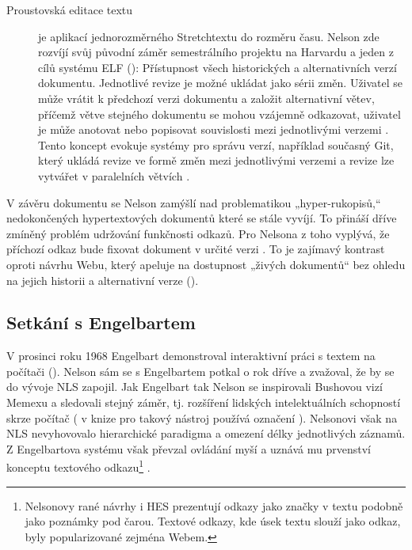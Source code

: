 \begin{description}
  \label{p:ht:proust}
  \item[Proustovská editace textu] je aplikací jednorozměrného Stretchtextu do rozměru času. Nelson zde rozvíjí svůj původní záměr semestrálního projektu na Harvardu a jeden z cílů systému ELF (): Přístupnost všech historických a alternativních verzí dokumentu. Jednotlivé revize je možné ukládat jako sérii změn. Uživatel se může vrátit k předchozí verzi dokumentu a založit alternativní větev, příčemž větve stejného dokumentu se mohou vzájemně odkazovat, uživatel je může anotovat nebo popisovat souvislosti mezi jednotlivými verzemi \autocite[20--21]{hin68}.
  Tento koncept evokuje systémy pro správu verzí, například současný Git, který ukládá revize ve formě změn mezi jednotlivými verzemi a revize lze vytvářet v paralelních větvích \autocite{Git}.
\end{description}

V závěru dokumentu se Nelson zamýšlí nad problematikou „hyper-rukopisů,“ nedokončených hypertextových dokumentů které se stále vyvíjí. To přináší dříve zmíněný problém udržování funkčnosti odkazů. Pro Nelsona z toho vyplývá, že příchozí odkaz bude fixovat dokument v určité verzi \autocite[23--24]{hin68}.
To je zajímavý kontrast oproti návrhu Webu, který apeluje na dostupnost „živých dokumentů“ bez ohledu na jejich historii a alternativní verze ().

\subsection{Setkání s Engelbartem}
\label{sec:xanadu:engelbart}

V prosinci roku 1968 Engelbart demonstroval interaktivní práci s textem na počítači (). Nelson sám se s Engelbartem potkal o rok dříve a zvažoval, že by se do vývoje NLS zapojil. Jak Engelbart tak Nelson se inspirovali Bushovou vizí Memexu a sledovali stejný záměr, tj. rozšíření lidských intelektuálních schopností skrze počítač (\textcite{Nelson1974} v knize  pro takový nástroj používá označení ). Nelsonovi však na NLS nevyhovovalo hierarchické paradigma a omezení délky jednotlivých záznamů. Z Engelbartova systému však převzal ovládání myší a uznává mu prvenství konceptu textového odkazu\footnote{Nelsonovy rané návrhy i HES prezentují odkazy jako značky v textu podobně jako poznámky pod čarou. Textové odkazy, kde úsek textu slouží jako odkaz, byly popularizované zejména Webem.} \autocite[78--79]{Barnet2014}.

